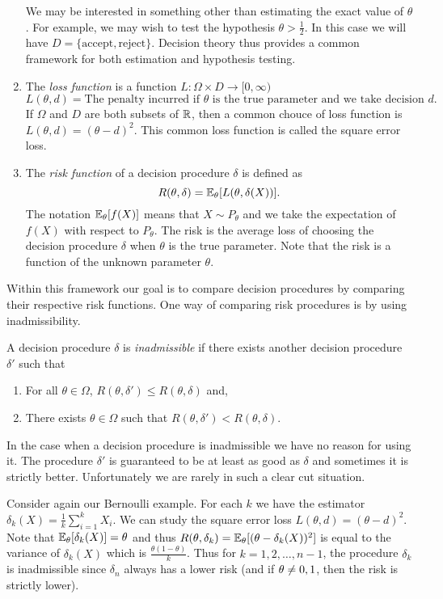 \begin{enumerate}
    We may be interested in something other than estimating the exact value of $\theta$. For example, we may wish to test the hypothesis $\theta > \frac{1}{2}$. In this case we will have $D = \{\text{accept}, \text{reject} \}$. Decision theory thus provides a common framework for both estimation and hypothesis testing.
    \item The \emph{loss function} is a function $L : \Omega \times D \to [0,\infty)$
    \[L(\theta, d) = \text{The penalty incurred if $\theta$ is the true parameter and we take decision $d$}. \]
    If $\Omega$ and $D$ are both subsets of ${\mathbb R}$, then a common chouce of loss function is $L(\theta, d) = (\theta - d)^2$. This common loss function is called the square error loss.
    \item The \emph{risk function} of a decision procedure $\delta$ is defined as 
    \[R(\theta, \delta) = {\mathbb{E}}_\theta[L(\theta, \delta(X))]. \]
    The notation ${\mathbb{E}}_\theta[f(X)]$ means that $X \sim P_\theta$ and we take the expectation of $f(X)$ with respect to $P_\theta$. The risk is the average loss of choosing the decision procedure $\delta$ when $\theta$ is the true parameter. Note that the risk is a function of the unknown parameter $\theta$.
\end{enumerate}
Within this framework our goal is to compare decision procedures by comparing their respective risk functions. One way of comparing risk procedures is by using inadmissibility. 

\begin{defn}
    A decision procedure $\delta$ is \emph{inadmissible} if there exists another decision procedure $\delta'$ such that
    \begin{enumerate}
        \item For all $\theta \in \Omega$, $R(\theta, \delta') \le R(\theta, \delta)$ and,
        \item There exists $\theta \in \Omega$ such that $R(\theta, \delta') < R(\theta, \delta)$.
    \end{enumerate} 
\end{defn}
In the case when a decision procedure is inadmissible we have no reason for using it. The procedure $\delta'$ is guaranteed to be at least as good as $\delta$ and sometimes it is strictly better. Unfortunately we are rarely in such a clear cut situation.

Consider again our Bernoulli example. For each $k$ we have the estimator $\delta_k(X) = \frac{1}{k}\sum_{i=1}^k X_i$. We can study the square error loss $L(\theta, d) = (\theta - d)^2$. Note that ${\mathbb{E}}_\theta[\delta_k(X)] = \theta$ and thus $R(\theta,\delta_k) = {\mathbb{E}}_\theta[(\theta-\delta_k(X))^2]$ is equal to the variance of $\delta_k(X)$ which is $\frac{\theta(1-\theta)}{k}$. Thus for $k=1,2,\ldots,n-1$, the procedure $\delta_k$ is inadmissible since $\delta_n$ always has a lower risk (and if ${\theta} \neq 0,1$, then the risk is strictly lower).

